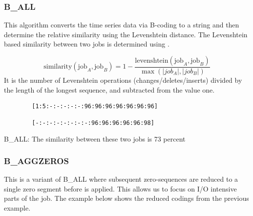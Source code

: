 \documentclass{jhps}
\begin{document}
\subsubsection{B\_ALL}
This algorithm converts the time series data via B-coding to a string and then determine the relative similarity using the Levenshtein distance.
The Levenshtein based similarity between two jobs is determined using .

\begin{equation}
	\text{similarity}\left(\text{job}_{A},\text{job}_{B} \right) = 1 - \frac{\text{levenshtein}\left(\text{job}_{A},\text{job}_{B} \right) }{\max \left(|job_{A}|,|job_{B}| \right) } \label{eq:sim:bin_all}
\end{equation}
It is the number of Levenshtein operations (changes/deletes/inserts) divided by the length of the longest sequence, and subtracted from the value one.


\begin{listing}
	\noindent\begin{minipage}{0.50\textwidth}
		\begin{lstlisting}
		[1:5:-:-:-:-:-:96:96:96:96:96:96:96]
		\end{lstlisting}
		\vspace{-2em}
		\label{lst:test:a}
	\end{minipage}
	\hfill
	\noindent\begin{minipage}{0.50\textwidth}
		\begin{lstlisting}
		[-:-:-:-:-:-:-:-:96:96:96:96:96:98]
		\end{lstlisting}
		\vspace{-2em}
		\label{lst:test:b}
	\end{minipage}
	\caption{B\_ALL: The similarity between these two jobs is 73 percent}
	\label{lst:test}
\end{listing}


\subsubsection{B\_AGGZEROS}
This is a variant of B\_ALL where subsequent zero-sequences are reduced to a single zero segment before  is applied.
This allows us to focus on I/O intensive parts of the job.
The example below shows the reduced codings from the previous example.
\end{document}
